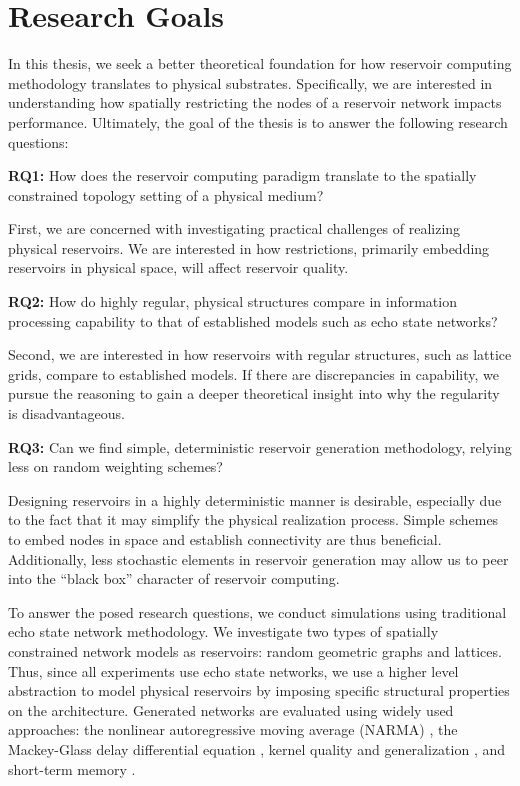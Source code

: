 \section{Research Goals}

In this thesis, we seek a better theoretical foundation for how reservoir
computing methodology translates to physical substrates. Specifically, we are
interested in understanding how spatially restricting the nodes of a reservoir
network impacts performance. Ultimately, the goal of the thesis is to answer the
following research questions:

\textbf{RQ1:} How does the reservoir computing paradigm translate to the
spatially constrained topology setting of a physical medium?

First, we are concerned with investigating practical challenges of realizing
physical reservoirs. We are interested in how restrictions, primarily embedding
reservoirs in physical space, will affect reservoir quality.

\textbf{RQ2:} How do highly regular, physical structures compare in information
processing capability to that of established models such as echo state networks?

Second, we are interested in how reservoirs with regular structures, such as
lattice grids, compare to established models. If there are discrepancies in
capability, we pursue the reasoning to gain a deeper theoretical insight into
why the regularity is disadvantageous.

\textbf{RQ3:} Can we find simple, deterministic reservoir generation
methodology, relying less on random weighting schemes?

Designing reservoirs in a highly deterministic manner is desirable, especially
due to the fact that it may simplify the physical realization process. Simple
schemes to embed nodes in space and establish connectivity are thus
beneficial. Additionally, less stochastic elements in reservoir generation may
allow us to peer into the ``black box'' character of reservoir computing.

To answer the posed research questions, we conduct simulations using traditional
echo state network methodology. We investigate two types of spatially
constrained network models as reservoirs: random geometric graphs and
lattices. Thus, since all experiments use echo state networks, we use a higher
level abstraction to model physical reservoirs by imposing specific structural
properties on the architecture. Generated networks are evaluated using widely
used approaches: the nonlinear autoregressive moving average (NARMA)
\cite{atiya_new_2000}, the Mackey-Glass delay differential equation
\cite{mackey_oscillation_1977}, kernel quality and generalization
\cite{legenstein_edge_2007}, and short-term memory \cite{jaeger_short_2002}.

